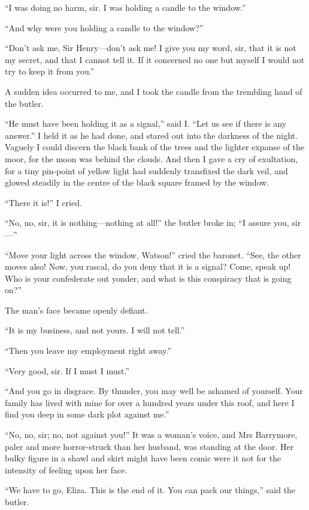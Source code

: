 \documentclass[paper=5.5in:8.5in,BCOR=7mm,twoside,DIV=calc,12pt,usegeometry,openany,chapterprefix,endperiod,headings=big]{scrbook} %
\begin{document}
\enquote{I was doing no harm, sir. I was holding a candle to the window.}

\enquote{And why were you holding a candle to the window?}

\enquote{Don't ask me, Sir Henry---don't ask me! I give you my word, sir, that it is not my secret, and that I cannot tell it. If it concerned no one but myself I would not try to keep it from you.}

A sudden idea occurred to me, and I took the candle from the trembling hand of the butler.

\enquote{He must have been holding it as a signal,} said I. \enquote{Let us see if there is any answer.} I held it as he had done, and stared out into the darkness of the night. Vaguely I could discern the black bank of the trees and the lighter expanse of the moor, for the moon was behind the clouds. And then I gave a cry of exultation, for a tiny pin-point of yellow light had suddenly transfixed the dark veil, and glowed steadily in the centre of the black square framed by the window.

\enquote{There it is!} I cried.

\enquote{No, no, sir, it is nothing---nothing at all!} the butler broke in; \enquote{I assure you, sir---}

\enquote{Move your light across the window, Watson!} cried the baronet. \enquote{See, the other moves also! Now, you rascal, do you deny that it is a signal? Come, speak up! Who is your confederate out yonder, and what is this conspiracy that is going on?}

The man's face became openly defiant.

\enquote{It is my business, and not yours. I will not tell.}

\enquote{Then you leave my employment right away.}

\enquote{Very good, sir. If I must I must.}

\enquote{And you go in disgrace. By thunder, you may well be ashamed of yourself. Your family has lived with mine for over a hundred years under this roof, and here I find you deep in some dark plot against me.}

\enquote{No, no, sir; no, not against you!} It was a woman's voice, and Mrs Barrymore, paler and more horror-struck than her husband, was standing at the door. Her bulky figure in a shawl and skirt might have been comic were it not for the intensity of feeling upon her face.

\enquote{We have to go, Eliza. This is the end of it. You can pack our things,} said the butler.
\end{document}
